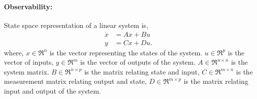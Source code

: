 \documentclass[12pt]{article}
\begin{document}
\paragraph{Observability:}
State space representation of a linear system is,
\begin{equation}
\label{eq:dyn_l}
\begin{split}
\dot{x} &= Ax + Bu\\
y &= Cx + Du.
\end{split}
\end{equation}
where, $x \in \Re^{n}$ is the vector representing the states of the system. $u \in \Re^{p}$ is the vector of inputs, $y \in \Re^{m}$ is the vector of outputs of the system. $A \in \Re^{n \times n}$ is the system matrix. $B \in \Re^{n \times p}$ is the matrix relating state and input, $C \in \Re^{m \times n}$ is the measurement matrix relating output and state, $D \in \Re^{m \times p}$ is the matrix relating input and output of the system.
\end{document}
